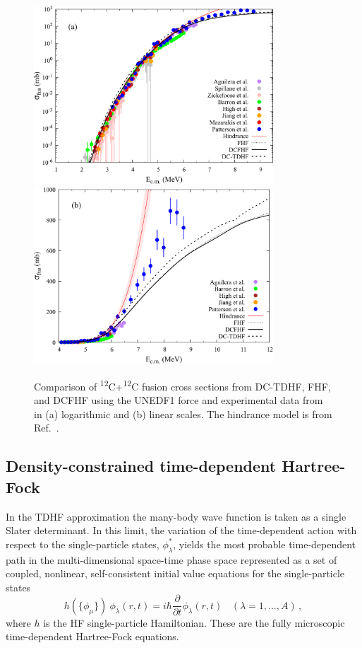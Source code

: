 \begin{figure}
	\includegraphics[width=0.8\textwidth]{../Figures/CC/CrossSections.pdf}
	\includegraphics[width=0.8\textwidth]{../Figures/CC/CrossSectionsLinear.pdf}
	\caption{Comparison of \textsuperscript{12}C+\textsuperscript{12}C fusion cross sections from DC-TDHF, FHF, and DCFHF using the UNEDF1 force and experimental data from~\protect\citep{aguilera2006,spillane2007,zickefoose2011,barron-palos2006,high1977,jiang2018,mazarakis1973,patterson1969} in (a) logarithmic and (b) linear scales. The hindrance model is from Ref.~\protect\citep{jiang2007}.}
	\label{fig:xsec}
\end{figure}

\subsection{Density-constrained time-dependent Hartree-Fock}
\label{sec:dctdhf}


In the TDHF approximation the many-body wave function is taken as a single
Slater determinant.
In this limit, the variation of the time-dependent action with respect to the single-particle states, $\phi^{*}_{\lambda}$, yields the most probable time-dependent path
in the multi-dimensional space-time phase space represented as a
set of coupled, nonlinear, self-consistent initial value equations
for the single-particle states
\begin{equation}
h(\{\phi_{\mu}\}) \ \phi_{\lambda} (r,t) = i \hbar \frac{\partial}{\partial t} \phi_{\lambda} (r,t)
\ \ \ \ (\lambda = 1,...,A)\,,
\label{eq:TDHF}
\end{equation}
where $h$ is the HF single-particle Hamiltonian.
These are the fully microscopic time-dependent Hartree-Fock equations.

